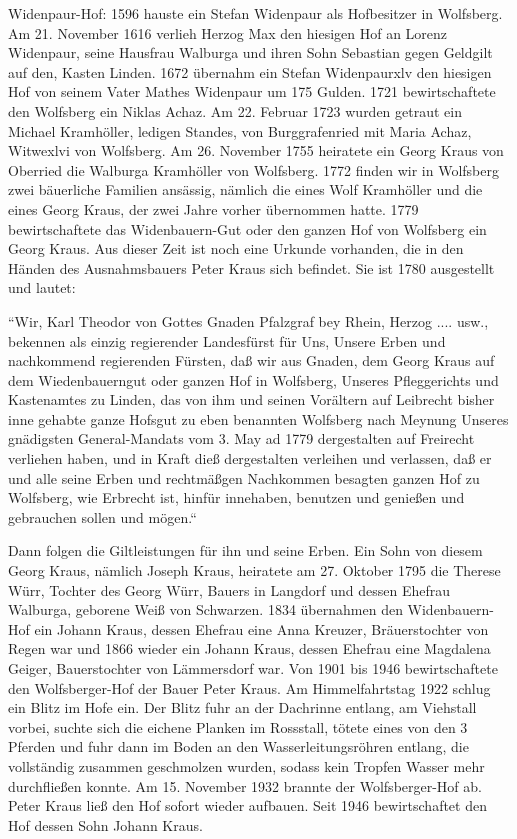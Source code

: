 \documentclass[12pt,a4pager]{book}
\begin{document}
Widenpaur-Hof: 1596 hauste ein Stefan Widenpaur als Hofbesitzer in Wolfsberg. Am
21. November 1616 verlieh Herzog Max den hiesigen Hof an Lorenz Widenpaur, seine
Hausfrau Walburga und ihren Sohn Sebastian gegen Geldgilt auf den, Kasten
Linden. 1672 übernahm ein Stefan Widenpaurxlv den hiesigen Hof von seinem Vater
Mathes Widenpaur um 175 Gulden. 1721 bewirtschaftete den Wolfsberg ein Niklas
Achaz. Am 22. Februar 1723 wurden getraut ein Michael Kramhöller, ledigen
Standes, von Burggrafenried mit Maria Achaz, Witwexlvi von Wolfsberg. Am 26.
November 1755 heiratete ein Georg Kraus von Oberried die Walburga Kramhöller von
Wolfsberg. 1772 finden wir in Wolfsberg zwei bäuerliche Familien ansässig,
nämlich die eines Wolf Kramhöller und die eines Georg Kraus, der zwei Jahre
vorher übernommen hatte. 1779 bewirtschaftete das Widenbauern-Gut oder den
ganzen Hof von Wolfsberg ein Georg Kraus. Aus dieser Zeit ist noch eine Urkunde
vorhanden, die in den Händen des Ausnahmsbauers Peter Kraus sich befindet. Sie
ist 1780 ausgestellt und lautet:

“Wir, Karl Theodor von Gottes Gnaden Pfalzgraf bey Rhein, Herzog .... usw.,
bekennen als einzig regierender Landesfürst für Uns, Unsere Erben und
nachkommend regierenden Fürsten, daß wir aus Gnaden, dem Georg Kraus auf dem
Wiedenbauerngut oder ganzen Hof in Wolfsberg, Unseres Pfleggerichts und
Kastenamtes zu Linden, das von ihm und seinen Vorältern auf Leibrecht bisher
inne gehabte ganze Hofsgut zu eben benannten Wolfsberg nach Meynung Unseres
gnädigsten General-Mandats vom 3. May ad 1779 dergestalten auf Freirecht
verliehen haben, und in Kraft dieß dergestalten verleihen und verlassen, daß er
und alle seine Erben und rechtmäßgen Nachkommen besagten ganzen Hof zu
Wolfsberg, wie Erbrecht ist, hinfür innehaben, benutzen und genießen und
gebrauchen sollen und mögen.“

Dann folgen die Giltleistungen für ihn und seine Erben. Ein Sohn von diesem
Georg Kraus, nämlich Joseph Kraus, heiratete am 27. Oktober 1795 die Therese
Würr, Tochter des Georg Würr, Bauers in Langdorf und dessen Ehefrau Walburga,
geborene Weiß von Schwarzen. 1834 übernahmen den Widenbauern-Hof ein Johann
Kraus, dessen Ehefrau eine Anna Kreuzer, Bräuerstochter von Regen war und 1866
wieder ein Johann Kraus, dessen Ehefrau eine Magdalena Geiger, Bauerstochter von
Lämmersdorf war. Von 1901 bis 1946 bewirtschaftete den Wolfsberger-Hof der Bauer
Peter Kraus. Am Himmelfahrtstag 1922 schlug ein Blitz im Hofe ein. Der Blitz
fuhr an der Dachrinne entlang, am Viehstall vorbei, suchte sich die eichene
Planken im Rossstall, tötete eines von den 3 Pferden und fuhr dann im Boden an
den Wasserleitungsröhren entlang, die vollständig zusammen geschmolzen wurden,
sodass kein Tropfen Wasser mehr durchfließen konnte. Am 15. November 1932
brannte der Wolfsberger-Hof ab. Peter Kraus ließ den Hof sofort wieder aufbauen.
Seit 1946 bewirtschaftet den Hof dessen Sohn Johann Kraus.
\end{document}
